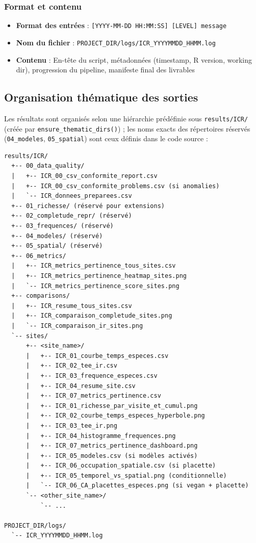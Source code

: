 \documentclass[11pt,a4paper]{article}
\begin{document}
\subsubsection{Format et contenu}
\begin{itemize}
  \item \textbf{Format des entrées} : \texttt{[YYYY-MM-DD HH:MM:SS] [LEVEL] message}
  \item \textbf{Nom du fichier} : \texttt{PROJECT\_DIR/logs/ICR\_YYYYMMDD\_HHMM.log}
  \item \textbf{Contenu} : En-tête du script, métadonnées (timestamp, R version, working dir), progression du pipeline, manifeste final des livrables
\end{itemize}

\subsection{Organisation thématique des sorties}
Les résultats sont organisés selon une hiérarchie prédéfinie sous \texttt{results/ICR/}
(créée par \texttt{ensure\_thematic\_dirs()}) ; les noms exacts des répertoires réservés
(\texttt{04\_modeles}, \texttt{05\_spatial}) sont ceux définis dans le code source :

\begin{verbatim}
results/ICR/
  +-- 00_data_quality/
  |   +-- ICR_00_csv_conformite_report.csv
  |   +-- ICR_00_csv_conformite_problems.csv (si anomalies)
  |   `-- ICR_donnees_preparees.csv
  +-- 01_richesse/ (réservé pour extensions)
  +-- 02_completude_repr/ (réservé)
  +-- 03_frequences/ (réservé)
  +-- 04_modeles/ (réservé)
  +-- 05_spatial/ (réservé)
  +-- 06_metrics/
  |   +-- ICR_metrics_pertinence_tous_sites.csv
  |   +-- ICR_metrics_pertinence_heatmap_sites.png
  |   `-- ICR_metrics_pertinence_score_sites.png
  +-- comparisons/
  |   +-- ICR_resume_tous_sites.csv
  |   +-- ICR_comparaison_completude_sites.png
  |   `-- ICR_comparaison_ir_sites.png
  `-- sites/
      +-- <site_name>/
      |   +-- ICR_01_courbe_temps_especes.csv
      |   +-- ICR_02_tee_ir.csv
      |   +-- ICR_03_frequence_especes.csv
      |   +-- ICR_04_resume_site.csv
      |   +-- ICR_07_metrics_pertinence.csv
      |   +-- ICR_01_richesse_par_visite_et_cumul.png
      |   +-- ICR_02_courbe_temps_especes_hyperbole.png
      |   +-- ICR_03_tee_ir.png
      |   +-- ICR_04_histogramme_frequences.png
      |   +-- ICR_07_metrics_pertinence_dashboard.png
      |   +-- ICR_05_modeles.csv (si modèles activés)
      |   +-- ICR_06_occupation_spatiale.csv (si placette)
      |   +-- ICR_05_temporel_vs_spatial.png (conditionnelle)
      |   `-- ICR_06_CA_placettes_especes.png (si vegan + placette)
      `-- <other_site_name>/
          `-- ...

PROJECT_DIR/logs/
  `-- ICR_YYYYMMDD_HHMM.log
\end{verbatim}
\end{document}
